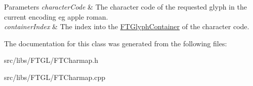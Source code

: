 \begin{DoxyParams}{Parameters}
{\em characterCode} & The character code of the requested glyph in the current encoding eg apple roman. \\
\hline
{\em containerIndex} & The index into the \hyperlink{class_f_t_glyph_container}{FTGlyphContainer} of the character code. \\
\hline
\end{DoxyParams}


The documentation for this class was generated from the following files:\begin{DoxyCompactItemize}
\item 
src/libs/FTGL/FTCharmap.h\item 
src/libs/FTGL/FTCharmap.cpp\end{DoxyCompactItemize}
